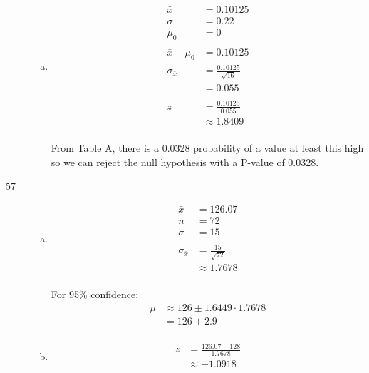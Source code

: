 \documentclass[letterpaper, landscape]{exam}
\begin{document}
\begin{description}
\begin{enumerate}[(a)]
          \item
            \begin{align*}
              \bar{x} & = 0.10125 \\
              \sigma  & = 0.22 \\
              \mu_0   & = 0 \\
              \\
              \bar{x} - \mu_0  & = 0.10125 \\
              \sigma_{\bar{x}} & = \frac{0.10125}{\sqrt{16}} \\
                               & = 0.055 \\
              \\
              z & = \frac{0.10125}{0.055} \\
                & \approx 1.8409 \\
            \end{align*}

            From Table A, there is a 0.0328 probability of a value at least this
            high so we can reject the null hypothesis with a P-value of 0.0328.

        \end{enumerate}

      \item[57]
        \begin{enumerate}[(a)]
          \item 
            \begin{align*}
              \bar{x} & = 126.07 \\
              n       & = 72 \\
              \sigma  & = 15 \\
              \\
              \sigma_{\bar{x}} & = \frac{15}{\sqrt{72}} \\
                               & \approx 1.7678 \\
            \end{align*}

            For 95\% confidence:
            \begin{align*}
              \mu & \approx 126 \pm 1.6449 \cdot 1.7678 \\
                  & = 126 \pm 2.9 \\
            \end{align*}


          \item 
            \begin{align*}
              z & = \frac{126.07 - 128}{1.7678} \\
                & \approx -1.0918 \\
            \end{align*}


\end{enumerate}
\end{description}
\end{document}
